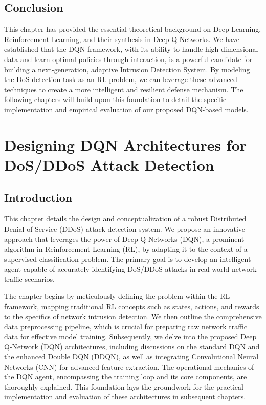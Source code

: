 \documentclass[12pt]{report}
\begin{document}
\section{Conclusion}
This chapter has provided the essential theoretical background on Deep Learning, Reinforcement Learning, and their synthesis in Deep Q-Networks. We have established that the DQN framework, with its ability to handle high-dimensional data and learn optimal policies through interaction, is a powerful candidate for building a next-generation, adaptive Intrusion Detection System. By modeling the DoS detection task as an RL problem, we can leverage these advanced techniques to create a more intelligent and resilient defense mechanism. The following chapters will build upon this foundation to detail the specific implementation and empirical evaluation of our proposed DQN-based models.

\chapter{Designing DQN Architectures for DoS/DDoS Attack Detection}
\section{Introduction}

This chapter details the design and conceptualization of a robust Distributed Denial of Service (DDoS) attack detection system. We propose an innovative approach that leverages the power of Deep Q-Networks (DQN), a prominent algorithm in Reinforcement Learning (RL), by adapting it to the context of a supervised classification problem. The primary goal is to develop an intelligent agent capable of accurately identifying DoS/DDoS attacks in real-world network traffic scenarios.

The chapter begins by meticulously defining the problem within the RL framework, mapping traditional RL concepts such as states, actions, and rewards to the specifics of network intrusion detection. We then outline the comprehensive data preprocessing pipeline, which is crucial for preparing raw network traffic data for effective model training. Subsequently, we delve into the proposed Deep Q-Network (DQN) architectures, including discussions on the standard DQN and the enhanced Double DQN (DDQN), as well as integrating Convolutional Neural Networks (CNN) for advanced feature extraction. The operational mechanics of the DQN agent, encompassing the training loop and its core components, are thoroughly explained. This foundation lays the groundwork for the practical implementation and evaluation of these architectures in subsequent chapters.
\end{document}
